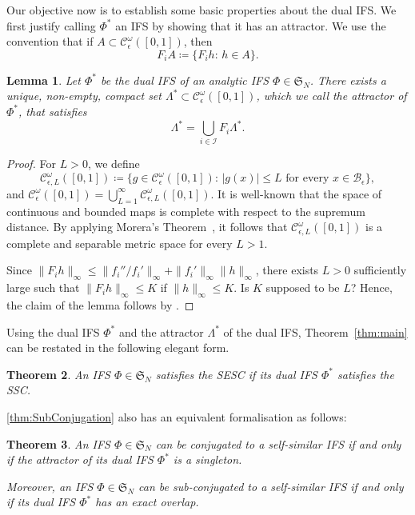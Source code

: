 \documentclass[12pt,]{article}
\def\cref#1{\ref{#1}}%
\newtheorem{theorem}{Theorem}[section]
\newtheorem{lemma}[theorem]{Lemma}
\theoremstyle{definition}
\theoremstyle{remark}
\newcommand{\0}{\mathbf{0}}
\begin{document}
Our objective now is to establish some basic properties about the dual IFS. We first justify calling $\Phi^*$ an IFS by showing that it has an
attractor. We use the convention that if $A\subset \mathcal{C}^{\omega}_\epsilon([0,1])$, then
\begin{equation*}
	F_iA \coloneqq \{F_i h:\, h\in A\}.
\end{equation*}
\begin{lemma}\label{lem:ExistanceAttractor}
	Let $\Phi^*$ be the dual IFS of an analytic IFS $\Phi\in\mathfrak{S}_N$. There exists a unique, non-empty,
	compact set $\Lambda^*\subset \mathcal{C}^{\omega}_\epsilon([0,1])$, which we call the \emph{attractor} of
	$\Phi^*$, that satisfies
	\begin{equation*}
		\Lambda^*=\bigcup_{i\in\mathcal{I}} F_i\Lambda^*.
	\end{equation*} 
\end{lemma} 

\begin{proof}
For $L>0$, we define 
$$
\mathcal{C}_{\epsilon,L}^{\omega}([0,1])\coloneqq \big\{g\in\mathcal{C}_\epsilon^{\omega}([0,1]):\, |g(x)|\leq L\text{ for every }x\in\mathcal{B}_\epsilon\big\},
$$
and $\mathcal{C}_{\epsilon}^{\omega}([0,1])=\bigcup_{L=1}^\infty\mathcal{C}_{\epsilon,L}^{\omega}([0,1])$. It is well-known that the space of continuous and bounded maps is complete with respect to the supremum distance. By applying Morera's Theorem~\cite[Theorem 10.17]{Rudin_AnalysisBook}, it follows that $\mathcal{C}_{\epsilon,L}^{\omega}([0,1])$ is a complete and separable metric space for every $L>1$.	
	
Since $\|F_ih\|_\infty\leq\|f_i'' / f_i'\|_\infty+\|f_i'\|_\infty\|h\|_\infty$, there exists $L>0$ sufficiently large such that $\|F_ih\|_\infty\leq K$ if $\|h\|_\infty\leq K$. {\color{red} Is $K$ supposed to be $L$?} Hence, the claim of the lemma follows by \cite{Hutchinson_Attractor_81}.
\end{proof}

Using the dual IFS $\Phi^*$ and the attractor $\Lambda^*$ of the dual IFS, Theorem~\ref{thm:main} can be restated in the following elegant form.
\begin{theorem}\label{thm:DualSSC}
	An IFS $\Phi\in\mathfrak{S}_N$ satisfies the SESC if its dual IFS $\Phi^*$ satisfies the SSC.
\end{theorem}

\cref{thm:SubConjugation} also has an equivalent formalisation as follows:

\begin{theorem}\label{thm:DualConj}
	An IFS $\Phi\in\mathfrak{S}_N$ can be conjugated to a self-similar IFS if and only if the attractor of its dual IFS $\Phi^*$ is a singleton. 
	
	Moreover, an IFS $\Phi\in\mathfrak{S}_N$ can be sub-conjugated to a self-similar IFS if and only if its dual IFS $\Phi^*$ has an exact overlap.
\end{theorem}
\end{document}
